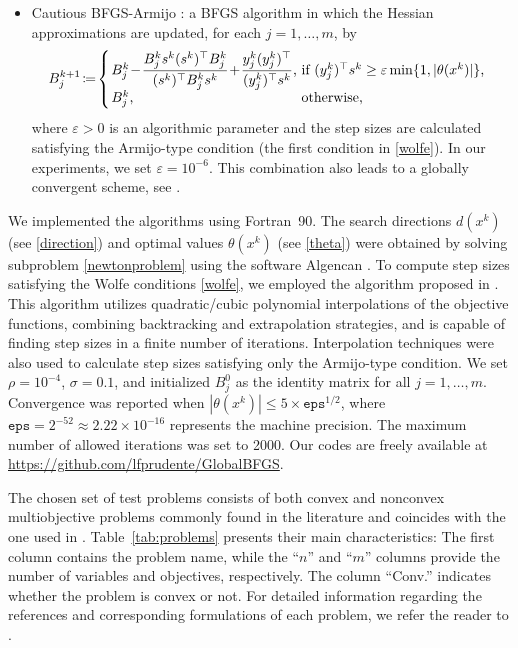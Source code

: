 \documentclass[11pt]{article}
\numberwithin{assumption}{section}
\begin{document}
\begin{itemize}
\item Cautious BFGS-Armijo \cite{QU2011397}: a BFGS algorithm  in which the Hessian approximations are updated, for each $j=1,\ldots,m$, by
\begin{equation*}\label{StBFGS}
B_j^{k+1}\!\coloneqq\!\left\{\hspace{-5pt}
\begin{tabular}{ll}
 $B_j^{k}\! -\! \dfrac{B_j^{k}s^k(s^k)^\top B_j^{k}}{(s^k)^\top B_j^ks^k}\!  +\!\dfrac{y_j^{k}(y_j^{k})^\top }{(y_j^{k})^\top s^k}$, &\hspace{-12pt} if $(y_j^{k})^\top s^k\geq \varepsilon \min\{1,|\theta(x^k)|\}$,\\
 $B_j^{k}$, & \hspace{-12pt} otherwise,
\end{tabular}\right.
\end{equation*}	
where $\varepsilon>0$ is an algorithmic parameter and the step sizes are calculated satisfying the Armijo-type condition (the first condition in \eqref{wolfe}). In our experiments, we set $\varepsilon=10^{-6}$. This combination also leads to a globally convergent scheme, see \cite{QU2011397}.
\end{itemize}

We implemented the algorithms using Fortran~90. The search directions $d(x^k)$ (see \eqref {direction}) and optimal values $\theta(x^k)$ (see \eqref{theta}) were obtained by solving subproblem \eqref{newtonproblem} using the software Algencan \cite{algencan}. To compute step sizes satisfying the Wolfe conditions \eqref{wolfe}, we employed the algorithm proposed in \cite{PerezPrudente2019}. This algorithm utilizes quadratic/cubic polynomial interpolations of the objective functions, combining backtracking and extrapolation strategies, and is capable of finding step sizes in a finite number of iterations. Interpolation techniques were also used to calculate step sizes satisfying only the Armijo-type condition. We set $\rho=10^{-4}$, $\sigma=0.1$, and initialized $B_j^0$ as the identity matrix for all $j=1,\ldots,m$. Convergence was reported when $|\theta(x^k)| \leq 5 \times \texttt{eps}^{1/2}$, where $\texttt{eps}=2^{-52}\approx 2.22 \times 10^{-16}$ represents the machine precision. The maximum number of allowed iterations was set to 2000. Our codes are freely available at \url{https://github.com/lfprudente/GlobalBFGS}.

The chosen set of test problems consists of both convex and nonconvex multiobjective problems commonly found in the literature and coincides with the one used in \cite{Leandro&Danilo}. Table~\ref{tab:problems} presents their main characteristics: The first column contains the problem name, while the ``$n$'' and ``$m$'' columns provide the number of variables and objectives, respectively. The column ``Conv.'' indicates whether the problem is convex or not. 
For detailed information regarding the references and corresponding formulations of each problem, we refer the reader to  \cite{Leandro&Danilo}.
\end{document}
